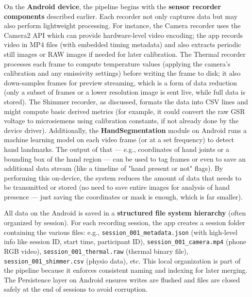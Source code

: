 \documentclass[11pt,a4paper]{report}
\begin{document}
On the \textbf{Android device}, the pipeline begins with the \textbf{sensor
recorder components} described earlier. Each recorder not only captures
data but may also perform lightweight processing. For instance, the
Camera recorder uses the Camera2 API which can provide hardware-level
video encoding; the app records video in MP4 files (with embedded timing
metadata) and also extracts periodic still images or RAW images if
needed for later calibration. The Thermal recorder processes each frame
to compute temperature values (applying the camera's calibration and any
emissivity settings) before writing the frame to disk; it also
down-samples frames for preview streaming, which is a form of data
reduction (only a subset of frames or a lower resolution image is sent
live, while full data is stored). The Shimmer recorder, as discussed,
formats the data into CSV lines and might compute basic derived metrics
(for example, it could convert the raw GSR voltage to microsiemens using
calibration constants, if not already done by the device driver).
Additionally, the \textbf{HandSegmentation} module on Android runs a machine
learning model on each video frame (or at a set frequency) to detect
hand
landmarks\cite{Picard2001}.
The output of that --- e.g., coordinates of hand joints or a bounding box
of the hand region --- can be used to tag frames or even to save an
additional data stream (like a timeline of "hand present or not" flags).
By performing this on-device, the system reduces the amount of data that
needs to be transmitted or stored (no need to save entire images for
analysis of hand presence --- just saving the coordinates or mask is
enough, which is far smaller).

All data on the Android is saved in a \textbf{structured file system
hierarchy} (often organized by session). For each recording session,
the app creates a session folder containing the various files: e.g.,
\texttt{session\_001\_metadata.json} (with high-level info like session ID, start
time, participant ID), \texttt{session\_001\_camera.mp4} (phone RGB video),
\texttt{session\_001\_thermal.raw} (thermal binary file),
\texttt{session\_001\_shimmer.csv} (physio data), etc. This local organization is
part of the pipeline because it enforces consistent naming and indexing
for later merging. The Persistence layer on Android ensures writes are
flushed and files are closed safely at the end of sessions to avoid
corruption.
\end{document}

